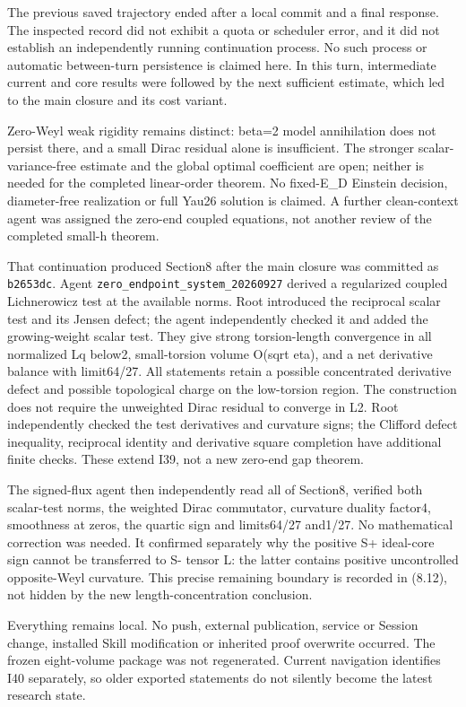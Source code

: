 \documentclass[
  10pt,
]{article}
\begin{document}
The previous saved trajectory ended after a local commit and a final
response. The inspected record did not exhibit a quota or scheduler
error, and it did not establish an independently running continuation
process. No such process or automatic between-turn persistence is
claimed here. In this turn, intermediate current and core results were
followed by the next sufficient estimate, which led to the main closure
and its cost variant.

Zero-Weyl weak rigidity remains distinct: beta=2 model annihilation does
not persist there, and a small Dirac residual alone is insufficient. The
stronger scalar-variance-free estimate and the global optimal
coefficient are open; neither is needed for the completed linear-order
theorem. No fixed-E\_D Einstein decision, diameter-free realization or
full Yau26 solution is claimed. A further clean-context agent was
assigned the zero-end coupled equations, not another review of the
completed small-h theorem.

That continuation produced Section8 after the main closure was committed
as \texttt{b2653dc}. Agent \nolinkurl{zero_endpoint_system_20260927}
derived a regularized coupled Lichnerowicz test at the available norms.
Root introduced the reciprocal scalar test and its Jensen defect; the
agent independently checked it and added the growing-weight scalar test.
They give strong torsion-length convergence in all normalized Lq below2,
small-torsion volume O(sqrt eta), and a net derivative balance with
limit64/27. All statements retain a possible concentrated derivative
defect and possible topological charge on the low-torsion region. The
construction does not require the unweighted Dirac residual to converge
in L2. Root independently checked the test derivatives and curvature
signs; the Clifford defect inequality, reciprocal identity and
derivative square completion have additional finite checks. These extend
I39, not a new zero-end gap theorem.

The signed-flux agent then independently read all of Section8, verified
both scalar-test norms, the weighted Dirac commutator, curvature duality
factor4, smoothness at zeros, the quartic sign and limits64/27 and1/27.
No mathematical correction was needed. It confirmed separately why the
positive S+ ideal-core sign cannot be transferred to S- tensor L: the
latter contains positive uncontrolled opposite-Weyl curvature. This
precise remaining boundary is recorded in (8.12), not hidden by the new
length-concentration conclusion.

Everything remains local. No push, external publication, service or
Session change, installed Skill modification or inherited proof
overwrite occurred. The frozen eight-volume package was not regenerated.
Current navigation identifies I40 separately, so older exported
statements do not silently become the latest research state.
\end{document}
